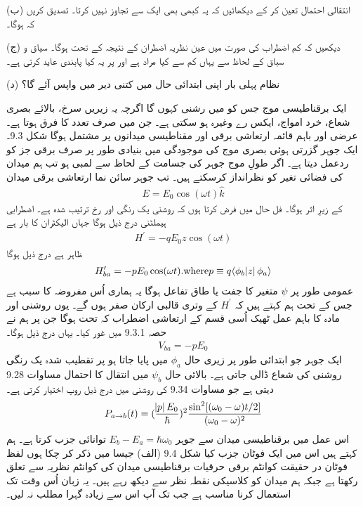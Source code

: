(ب) انتقالی احتمال  تعین کر کے دیکھائیں کہ یہ کبھی بھی ایک سے تجاوز نہیں کرتا۔ تصدیق کریں کہ  ہوگا۔

(ج) دیکھیں کہ کم اضطراب کی صورت میں  عین نظریہ اضطران کے نتیجہ  کے تحت ہوگا۔ سیاق و سباق کے لحاظ سے یہاں کم سے کیا مراد ہے اور  پر یہ کیا پابندی عاید کرتی ہے۔

(د) نظام پہلی بار اپنی ابتدائی حال میں کتنی دیر میں واپس آئے گا؟


ایک برقناطیسی موج جس کو میں رشنی کہوں گا اگرچہ یہ زیریں سرخ، بالائے بصری شعاع، خرد امواج، ایکس رے وغیرہ ہو سکتی ہے۔ جن میں صرف تعدد کا فرق ہوتا ہے۔ عرضی اور باہم قائمہ ارتعاشی برقی اور مقناطیسی میدانوں پر مشتمل ہوگا شکل \num{9.3}۔ ایک جوہر گزرتی ہوئی بصری موج کی موجودگی میں بنیادی طور پر صرف برقی جز کو ردعمل دیتا ہے۔ اگر طولِ موج جوہر کی جسامت کے لحاظ سے لمبی ہو تب ہم میدان کی فضائی تغیر کو نظرانداز کرسکتے ہیں۔ تب جوہر سائن نما ارتعاشی برقی میدان
\begin{align}
	E = E_0\cos(\omega t)\hat{k}
\end{align}
کے زیرِ اثر ہوگا۔ فل حال میں فرض کرتا ہوں کہ روشنی یک رنگی اور  رخ ترتیب شدہ ہے۔ اضطرابی ہیملٹنی درج ذیل ہوگا جہاں  الیکٹران کا بار ہے 
\begin{align}
	H^\prime =-qE_0z\cos(\omega t)
\end{align}	
ظاہر ہے درج ذیل ہوگا
\begin{align}
	H^{\prime}_{ba} =-pE_0 \cos(\omega t). \text{where} p \equiv q\langle \phi_b \abs{z}\phi_a\rangle
\end{align}
عمومی طور پر \(\psi\) متغیر  کا جفت یا طاق تفاعل ہوگا یہ ہماری اُس مفروضہ کا سبب ہے جس کے تحت ہم کہتے ہیں کہ \(H^\prime\) کے وتری قالبی ارکان صفر ہوں گے۔ یوں روشنی اور مادہ کا باہم عمل ٹھیک اُسی قسم کے ارتعاشی اضطراب کہ تحت ہوگا جن پر ہم نے حصہ 9.3.1 میں غور کیا۔ یہاں درج ذیل ہوگا۔  
\begin{align}
	V_{ba} = -pE_0
\end{align}
ایک جوہر جو ابتدائی طور پر زیری حال \(\phi_a\) میں پایا جاتا ہو پر تقطیب شدہ یک رنگی روشنی کی شعاع ڈالی جاتی ہے۔ بالائی حال \(\psi_b\) میں انتقال کا احتمال مساوات \num{9.28} دیتی ہے جو مساوات \num{9.34} کی روشنی میں درج ذیل روپ اختیار کرتی ہے۔
\begin{align}
	P_{a\rightarrow b} (t) = (\frac{\abs{p}E_0}{\hbar})^2 \frac{\sin^2[(\omega_0 - \omega)t/2]}{(\omega_0 - \omega)^2}
\end{align}
اس عمل میں برقناطیسی میدان سے جوہر \(E_b - E_a = \hbar\omega_0\) توانائی جزب کرتا ہے۔ ہم کہتے ہیں اس میں ایک فوٹان جزب کیا شکل \num{9.4} (الف) جیسا میں ذکر کر چکا ہوں لفظ فوٹان در حقیقت کوانٹم برقی حرقیات برقناطیسی میدان کی کوانٹم نظریہ سے تعلق رکھتا ہے جبکہ ہم میدان کو کلاسیکی نقطہ نظر سے دیکھ رہے ہیں۔ یہ زبان اُس وقت تک استعمال کرنا مناسب ہے جب تک آپ اس سے زیادہ گہرا مطلب نہ لیں۔

